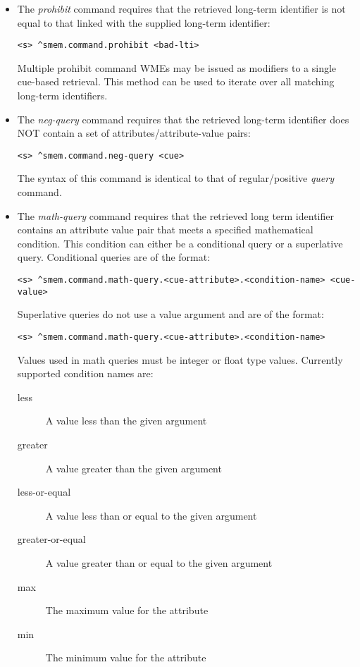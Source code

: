 \begin{itemize}

\item 
The \emph{prohibit} command requires that the retrieved long-term identifier is not equal to that linked with the supplied long-term identifier:
\begin{verbatim}
<s> ^smem.command.prohibit <bad-lti>
\end{verbatim}
Multiple prohibit command WMEs may be issued as modifiers to a single cue-based retrieval.  
This method can be used to iterate over all matching long-term identifiers.

\item 
The \emph{neg-query} command requires that the retrieved long-term identifier does NOT contain a set of attributes/attribute-value pairs:
\begin{verbatim}
<s> ^smem.command.neg-query <cue>
\end{verbatim}
The syntax of this command is identical to that of regular/positive \emph{query} command.

\item
The \emph{math-query} command requires that the retrieved long term identifier contains an attribute value pair that meets a specified mathematical condition. 
This condition can either be a conditional query or a superlative query. 
Conditional queries are of the format:
\begin{verbatim}
<s> ^smem.command.math-query.<cue-attribute>.<condition-name> <cue-value>
\end{verbatim}
Superlative queries do not use a value argument and are of the format:
\begin{verbatim}
<s> ^smem.command.math-query.<cue-attribute>.<condition-name>
\end{verbatim}
Values used in math queries must be integer or float type values.
Currently supported condition names are:
\begin{description}
  \item[less] A value less than the given argument
  \item[greater] A value greater than the given argument
  \item[less-or-equal] A value less than or equal to the given argument
  \item[greater-or-equal] A value greater than or equal to the given argument
  \item[max] The maximum value for the attribute
  \item[min] The minimum value for the attribute
\end{description}
\end{itemize}

